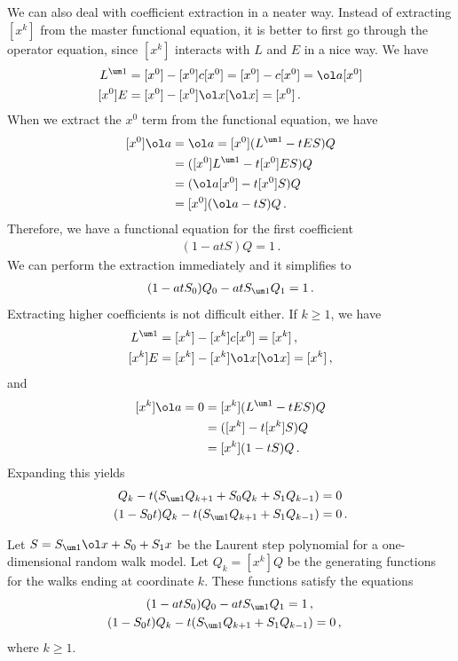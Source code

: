 We can also deal with coefficient extraction in a neater way. Instead of extracting $[x^k]$ from the master functional equation, it is better to first go through the operator equation, since $[x^k]$ interacts with $L$ and $E$ in a nice way. We have
\begin{align}
	[x^0]L^{\um 1} &= [x^0]-[x^0]c[x^0] = [x^0]-c[x^0] = \ol a[x^0]\\
	[x^0]E &= [x^0] - [x^0]\ol x[\ol x] = [x^0]\,.
\end{align}
When we extract the $x^0$ term from the functional equation, we have
\begin{align}
\begin{split}
	[x^0]\ol a &= \ol a = [x^0](L^{\um 1} - tES)Q \\
	&= ([x^0]L^{\um 1} - t[x^0]ES)Q \\
	&= (\ol a[x^0]-t[x^0]S)Q\\ 
	&= [x^0](\ol a-tS)Q\,.
\end{split}
\end{align}
Therefore, we have a functional equation for the first coefficient
\begin{align}
	[x^0](1-atS)Q = 1\,.
\end{align}
We can perform the extraction immediately and it simplifies to
\begin{align}
	(1-atS_0)Q_0-atS_{\um 1}Q_1 = 1\,.
\end{align}
Extracting higher coefficients is not difficult either. If $k \ge 1$, we have
\begin{align}
	[x^k]L^{\um 1} &= [x^k]-[x^k]c[x^0] = [x^k]\,,\\
	[x^k]E &= [x^k] - [x^k]\ol x[\ol x] = [x^k]\,,
\end{align}
and
\begin{align}
\begin{split}
	[x^k]\ol a = 0 &= [x^k](L^{\um 1} - tES)Q \\
	&= ([x^k] - t[x^k]S)Q \\
	&= [x^k](1-tS)Q\,.
\end{split}
\end{align}
Expanding this yields
\begin{align}\begin{split}
	Q_k - t(S_{\um 1}Q_{k+1}+S_0Q_k+S_1 Q_{k-1}) &= 0\\
	 (1-S_0t) Q_k -t(S_{\um 1}Q_{k+1} + S_1 Q_{k-1}) &= 0\,.
\end{split}\end{align}

\begin{prop} Let $S = S_{\um 1}\ol x+S_0 + S_1 x$ be the Laurent step polynomial for a one-dimensional random walk model. Let $Q_k = [x^k]Q$ be the generating functions for the walks ending at coordinate $k$. These functions satisfy the equations
\begin{align}
	(1-atS_0)Q_0-atS_{\um 1}Q_1 = 1\,,\\
	 (1-S_0t) Q_k -t(S_{\um 1}Q_{k+1} + S_1 Q_{k-1}) &= 0\,,
\end{align}
where $k\ge 1$.
\end{prop}

